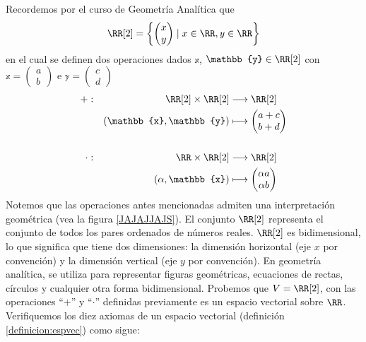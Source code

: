 \begin{examplebox}{}{}
    Recordemos por el curso de Geometría Analítica que
    $$\RR[2] = \left\{ \begin{pmatrix}
        x \\
        y
    \end{pmatrix} \mid x \in \RR, y \in \RR \right\}$$
    en el cual se definen dos operaciones dados $\mathbb{x}$, $\mathbb{y} \in \RR[2]$ con $\mathbb{x} = \begin{pmatrix}
        a \\
        b
    \end{pmatrix}$ e $\mathbb{y} = \begin{pmatrix}
        c \\
        d
    \end{pmatrix}$
    \begin{alignat*}{2}
        + &: & \quad \RR[2] \times \RR[2] & \longrightarrow \RR[2] \\
        & & (\mathbb{x}, \mathbb{y}) & \longmapsto \begin{pmatrix}
            a + c \\
            b + d
        \end{pmatrix} \\
        & \\
        \cdot &: & \quad \RR \times \RR[2] & \longrightarrow \RR[2] \\
        & & (\alpha, \mathbb{x}) & \longmapsto \begin{pmatrix}
            \alpha a \\
            \alpha b
        \end{pmatrix}
    \end{alignat*}
    Notemos que las operaciones antes mencionadas admiten una interpretación geométrica (vea la figura \ref{JAJAJJAJS}). El conjunto $\RR[2]$ representa el conjunto de todos los pares ordenados de números reales. $\RR[2]$ es bidimensional, lo que significa que tiene dos dimensiones: la dimensión horizontal (eje $x$ por convención) y la dimensión vertical (eje $y$ por convención). En geometría analítica, se utiliza para representar figuras geométricas, ecuaciones de rectas, círculos y cualquier otra forma bidimensional. Probemos que $V = \RR[2]$, con las operaciones “$+$” y “$\cdot$” definidas previamente es un espacio vectorial sobre $\RR$. Verifiquemos los diez axiomas de un espacio vectorial (definición \ref{definicion:espvec}) como sigue:
    \begin{enumerate}[label=\roman*), topsep=6pt, itemsep=0pt]

\end{enumerate}
\end{examplebox}
